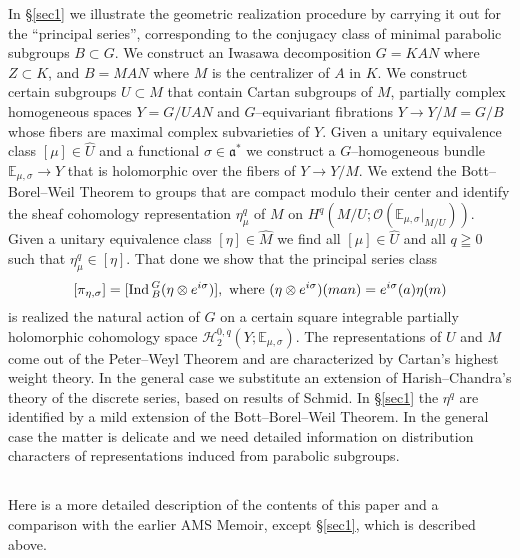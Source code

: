 \documentclass{conm-p-l}
\newcommand{\cO}{\mathcal{O}}
\def\ga{\mathfrak{a}}
\def\Ind{{\rm Ind\,}}
\def\E{\mathbb{E}}
\def\cH{\mathcal{H}}
\def\cO{\mathcal{O}}
\begin{document}
In \S \ref{sec1} we  illustrate the geometric realization procedure by carrying it out
for the ``principal series'', corresponding to the conjugacy class of minimal
parabolic subgroups $B \subset G$.  We construct an Iwasawa decomposition
$G = KAN$ where $Z \subset K$, and $B = MAN$ where $M$ is the centralizer of
$A$ in $K$.  We construct certain subgroups $U \subset M$ that contain Cartan
subgroups of $M$, partially complex homogeneous spaces $Y = G/UAN$ and
$G$--equivariant fibrations $Y \to Y/M = G/B$ whose fibers are maximal
complex subvarieties of $Y$.  Given a unitary equivalence class 
$[\mu] \in \widehat{U}$ and a functional $\sigma \in \ga^*$ we construct a
$G$--homogeneous bundle $\E_{\mu,\sigma} \to Y$ that is holomorphic over
the fibers of $Y \to Y/M$.  We extend the Bott--Borel--Weil Theorem to
groups that are compact modulo their center and identify the sheaf cohomology 
representation $\eta_\mu^q$
of $M$ on $H^q(M/U;\cO(\E_{\mu,\sigma}|_{M/U}))$.  Given a unitary equivalence
class $[\eta] \in \widehat{M}$ we find all $[\mu] \in \widehat{U}$ and all
$q \geqq 0$ such that $\eta_\mu^q \in [\eta]$.  That done we show that the 
principal series class 
$$
[\pi_{\eta,\sigma}] = [\Ind_B^G(\eta \otimes e^{i\sigma})], 
  \text{ where } (\eta \otimes e^{i\sigma})(man) = e^{i\sigma}(a)\eta(m)
$$
is realized the natural action of $G$ on a certain square integrable partially
holomorphic cohomology space $\cH_2^{0,q}(Y; \E_{\mu,\sigma})$.  The 
representations of $U$ and $M$ come out of the Peter--Weyl Theorem and are
characterized by Cartan's highest weight theory.  In the general case we
substitute an extension of Harish--Chandra's theory of the discrete series,
based on results of Schmid.  In \S \ref{sec1} the $\eta^q$ are identified  by a mild
extension of the Bott--Borel--Weil Theorem.  In the general case the matter is
delicate and we need detailed information on distribution characters of
representations induced from parabolic subgroups.

\subsection{} \label{ssec0b} 
\setcounter{equation}{0}
Here is a more detailed description of the contents
of this paper and a comparison with the earlier AMS Memoir, except 
\S \ref{sec1}, which is described above.
\end{document}
